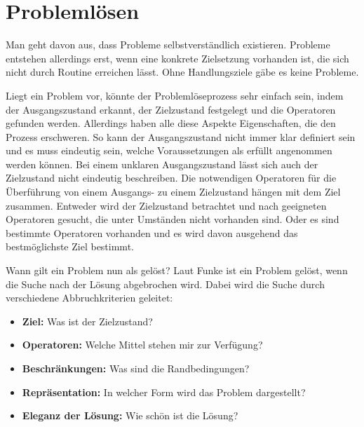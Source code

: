 \section{Problemlösen}
Man geht davon aus, dass Probleme selbstverständlich existieren. Probleme entstehen allerdings erst, wenn eine konkrete Zielsetzung vorhanden ist, die sich nicht durch Routine erreichen lässt. Ohne Handlungsziele gäbe es keine Probleme. \cite{Funke2015, Betsch2011,  Dorner1984}

Liegt ein Problem vor, könnte der Problemlöseprozess sehr einfach sein, indem der Ausgangszustand erkannt, der Zielzustand festgelegt und die Operatoren gefunden werden. Allerdings haben alle diese Aspekte Eigenschaften, die den Prozess erschweren. So kann der Ausgangszustand nicht immer klar definiert sein und es muss eindeutig sein, welche Voraussetzungen als erfüllt angenommen werden können. Bei einem unklaren Ausgangszustand lässt sich auch der Zielzustand nicht eindeutig beschreiben. Die notwendigen Operatoren für die Überführung von einem Ausgangs- zu einem Zielzustand hängen mit dem Ziel zusammen. Entweder wird der Zielzustand betrachtet und nach geeigneten Operatoren gesucht, die unter Umständen nicht vorhanden sind. Oder es sind bestimmte Operatoren vorhanden und es wird davon ausgehend das bestmöglichste Ziel bestimmt. \cite{Funke2015}

Wann gilt ein Problem nun als gelöst? Laut Funke \cite{Funke2015} ist ein Problem gelöst, wenn die Suche nach der Lösung abgebrochen wird. Dabei wird die Suche durch verschiedene Abbruchkriterien geleitet:
\begin{itemize}
\item \textbf{Ziel:} Was ist der Zielzustand?
\item \textbf{Operatoren:} Welche Mittel stehen mir zur Verfügung?
\item \textbf{Beschränkungen:} Was sind die Randbedingungen?
\item \textbf{Repräsentation:} In welcher Form wird das Problem dargestellt?
\item \textbf{Eleganz der Lösung:} Wie schön ist die Lösung?
\end{itemize}

